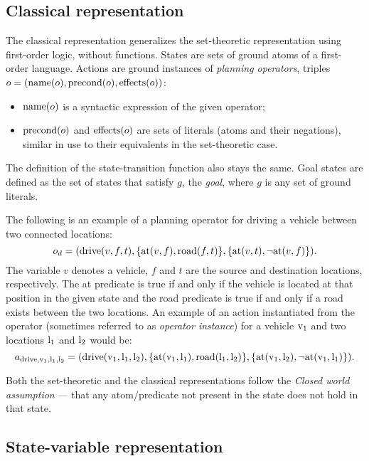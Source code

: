 \subsection{Classical representation}

The classical representation generalizes the set-theoretic representation using first-order logic,
without functions.
States are sets of ground atoms of a first-order language.
Actions are ground instances of \textit{planning operators},
triples $o = (\operatorname{\textrm{name}}(o), \operatorname{\textrm{precond}}(o), \operatorname{\textrm{effects}}(o))$:

\begin{itemize}
\item $\operatorname{\textrm{name}}(o)$ is a syntactic expression of the given operator;
\item $\operatorname{\textrm{precond}}(o)$ and $\operatorname{\textrm{effects}}(o)$ are sets of literals
(atoms and their negations), similar in use to their equivalents
in the set-theoretic case.
\end{itemize}
The definition of the state-transition function also stays the same.
Goal states are defined as the set of states that satisfy $g$,
the \textit{goal}, where $g$ is any set of ground literals.

The following is an example of a planning operator for driving a vehicle between two connected locations:
$$o_d = (\textrm{drive}(v, f, t), \{\textrm{at}(v, f), \textrm{road}(f, t)\}, \{\textrm{at}(v, t), \neg \textrm{at}(v, f)\}).$$
The variable $v$ denotes a vehicle, $f$ and $t$ are the source and destination locations, respectively. The at predicate is true if and only if the vehicle is located at that position in the given state and the road predicate
is true if and only if a road exists between the two locations.
An example of an action instantiated from the operator (sometimes referred to as \textit{operator instance})
for a vehicle $\textrm{v}_1$ and two locations $\textrm{l}_1$ and $\textrm{l}_2$ would be:
$$a_{\textrm{drive}, \textrm{v}_1, \textrm{l}_1, \textrm{l}_2} = (\textrm{drive}(\textrm{v}_1, \textrm{l}_1, \textrm{l}_2), \{\textrm{at}(\textrm{v}_1, \textrm{l}_1),
\textrm{road}(\textrm{l}_1, \textrm{l}_2)\}, \{\textrm{at}(\textrm{v}_1, \textrm{l}_2), \neg \textrm{at}(\textrm{v}_1, \textrm{l}_1)\}).$$


Both the set-theoretic and the classical representations follow the \textit{Closed world assumption} --- that any atom/predicate not present in the state does not hold in that state.

\subsection{State-variable representation}

